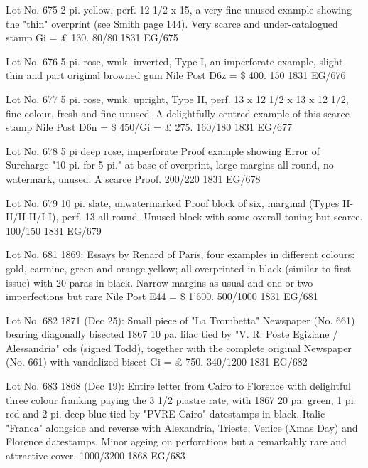 \documentclass[justified]{tufte-book}
\begin{document}
%
{Lot No. 675
2 pi. yellow, perf. 12 1/2 x 15, a very fine unused example showing the "thin" overprint (see Smith page 144). Very scarce and under-catalogued stamp Gi = £ 130. 80/80
}%
{1831}%
{EG/675}%
{}%
{}
{}%
{}


%
{Lot No. 676
5 pi. rose, wmk. inverted, Type I, an imperforate example, slight thin and part original browned gum Nile Post D6z = \$ 400. 150
}%
{1831}%
{EG/676}%
{}%
{}
{}%
{}


%
{Lot No. 677
5 pi. rose, wmk. upright, Type II, perf. 13 x 12 1/2 x 13 x 12 1/2, fine colour, fresh and fine unused. A delightfully centred example of this scarce stamp Nile Post D6n = \$ 450/Gi = £ 275. 160/180
}%
{1831}%
{EG/677}%
{}%
{}
{}%
{}

%
{Lot No. 678
5 pi deep rose, imperforate Proof example showing Error of Surcharge "10 pi. for 5 pi." at base of overprint, large margins all round, no watermark, unused. A scarce Proof. 200/220
}%
{1831}%
{EG/678}%
{}%
{}
{}%
{}

%
{Lot No. 679
10 pi. slate, unwatermarked Proof block of six, marginal (Types II-II/II-II/I-I), perf. 13 all round. Unused block with some overall toning but scarce. 100/150
}%
{1831}%
{EG/679}%
{}%
{}
{}%
{}

%
{Lot No. 681
1869: Essays by Renard of Paris, four examples in different colours: gold, carmine, green and orange-yellow; all overprinted in black (similar to first issue) with 20 paras in black. Narrow margins as usual and one or two imperfections but rare Nile Post E44 = \$ 1'600. 500/1000
}%
{1831}%
{EG/681}%
{}%
{}
{}%
{}

%
{Lot No. 682
1871 (Dec 25): Small piece of "La Trombetta" Newspaper (No. 661) bearing diagonally bisected 1867 10 pa. lilac tied by "V. R. Poste Egiziane / Alessandria" cds (signed Todd), together with the complete original Newspaper (No. 661) with vandalized bisect Gi = £ 750. 340/1200
}%
{1831}%
{EG/682}%
{}%
{}
{}%
{}

%
{Lot No. 683
1868 (Dec 19): Entire letter from Cairo to Florence with delightful three colour franking paying the 3 1/2 piastre rate, with 1867 20 pa. green, 1 pi. red and 2 pi. deep blue tied by "PVRE-Cairo" datestamps in black. Italic "Franca" alongside and reverse with Alexandria, Trieste, Venice (Xmas Day) and Florence datestamps. Minor ageing on perforations but a remarkably rare and attractive cover. 1000/3200
}%
{1868}%
{EG/683}%
{}%
{}
{}%
{}
\end{document}
